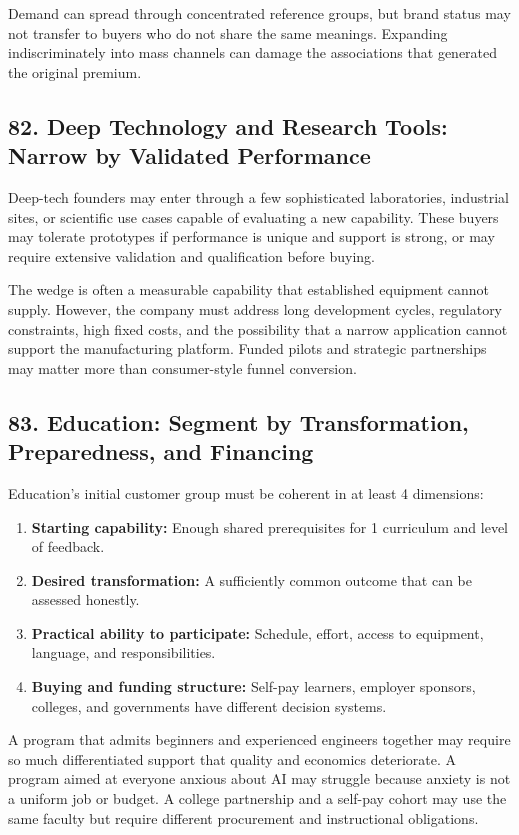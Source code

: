 Demand can spread through concentrated reference groups, but brand status may not transfer to buyers who do not share the same meanings. Expanding indiscriminately into mass channels can damage the associations that generated the original premium.

\subsection*{82. Deep Technology and Research Tools: Narrow by Validated Performance}

Deep-tech founders may enter through a few sophisticated laboratories, industrial sites, or scientific use cases capable of evaluating a new capability. These buyers may tolerate prototypes if performance is unique and support is strong, or may require extensive validation and qualification before buying.

The wedge is often a measurable capability that established equipment cannot supply. However, the company must address long development cycles, regulatory constraints, high fixed costs, and the possibility that a narrow application cannot support the manufacturing platform. Funded pilots and strategic partnerships may matter more than consumer-style funnel conversion.

\subsection*{83. Education: Segment by Transformation, Preparedness, and Financing}

Education's initial customer group must be coherent in at least 4 dimensions:

\begin{enumerate}
    \item \textbf{Starting capability:} Enough shared prerequisites for 1 curriculum and level of feedback.
    \item \textbf{Desired transformation:} A sufficiently common outcome that can be assessed honestly.
    \item \textbf{Practical ability to participate:} Schedule, effort, access to equipment, language, and responsibilities.
    \item \textbf{Buying and funding structure:} Self-pay learners, employer sponsors, colleges, and governments have different decision systems.
\end{enumerate}

A program that admits beginners and experienced engineers together may require so much differentiated support that quality and economics deteriorate. A program aimed at everyone anxious about AI may struggle because anxiety is not a uniform job or budget. A college partnership and a self-pay cohort may use the same faculty but require different procurement and instructional obligations.

